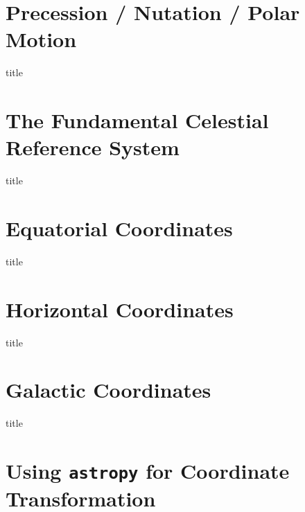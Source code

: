 \documentclass[aspectratio=1610, 9pt]{beamer}
\begin{document}

\section{Precession / Nutation / Polar Motion}

\begin{frame}{title}
\end{frame}

\section{The Fundamental Celestial Reference System}
\begin{frame}{title}
\end{frame}

\section{Equatorial Coordinates}
\begin{frame}{title}
\end{frame}

\section{Horizontal Coordinates}
\begin{frame}{title}
\end{frame}

\section{Galactic Coordinates}
\begin{frame}{title}
\end{frame}

\section{Using \texttt{astropy} for Coordinate Transformation}
\end{document}
